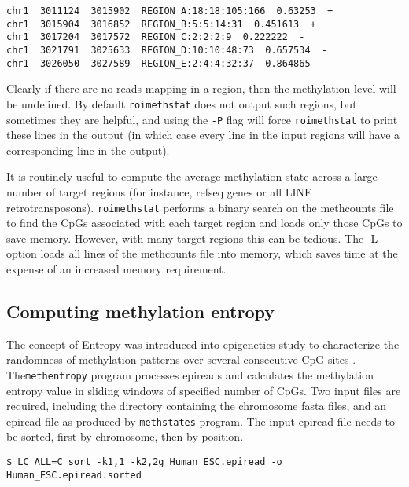 \documentclass[10pt]{article}
\newcommand{\prog}[1]{\texttt{#1}}
\newcommand{\op}[1]{\texttt{#1}}
\begin{document}
{{\begin{verbatim}
chr1  3011124  3015902  REGION_A:18:18:105:166  0.63253  +
chr1  3015904  3016852  REGION_B:5:5:14:31  0.451613  +
chr1  3017204  3017572  REGION_C:2:2:2:9  0.222222  -
chr1  3021791  3025633  REGION_D:10:10:48:73  0.657534  -
chr1  3026050  3027589  REGION_E:2:4:4:32:37  0.864865  -
\end{verbatim}

Clearly if there are no reads mapping in a region, then the
methylation level will be undefined. By default \prog{roimethstat}
does not output such regions, but sometimes they are helpful, and
using the \op{-P} flag will force \prog{roimethstat} to print these
lines in the output (in which case every line in the input regions
will have a corresponding line in the output).

It is routinely useful to compute the average methylation state across a
large number of target regions (for instance, refseq genes or all LINE
retrotransposons). \prog{roimethstat} performs a binary search on the
methcounts file to find the CpGs associated with each target region and
loads only those CpGs to save memory. However, with many target regions
this can be tedious. The -L option loads all lines of the methcounts
file into memory, which saves time at the expense of an increased
memory requirement.


\subsection{Computing methylation entropy}
\label{sec:methentropy}
The concept of Entropy was introduced into epigenetics study to
characterize the randomness of methylation patterns over several
consecutive CpG sites \cite{xie2011}. The\prog{methentropy} program
processes epireads and calculates the methylation entropy value in
sliding windows of specified number of CpGs. Two input files are
required, including the directory containing the chromosome fasta
files, and an epiread file as produced by \prog{methstates}
program. The input epiread file needs to be sorted, first by chromosome,
then by position. 
\begin{verbatim}
$ LC_ALL=C sort -k1,1 -k2,2g Human_ESC.epiread -o Human_ESC.epiread.sorted
\end{verbatim} 

}}
\end{document}
